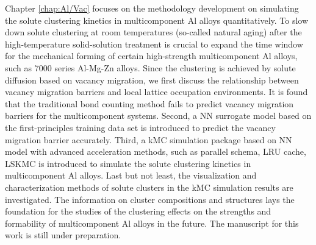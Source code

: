 Chapter \ref{chap:Al/Vac} focuses on the methodology development on simulating the solute clustering kinetics in multicomponent Al alloys quantitatively. To slow down solute clustering at room temperatures (so-called natural aging) after the high-temperature solid-solution treatment is crucial to expand the time window for the mechanical forming of certain high-strength multicomponent Al alloys, such as 7000 series Al-Mg-Zn alloys. Since the clustering is achieved by solute diffusion based on vacancy migration, we first discuss the relationship between vacancy migration barriers and local lattice occupation environments. It is found that the traditional bond counting method fails to predict vacancy migration barriers for the multicomponent systems. Second, a \acf{NN} surrogate model based on the first-principles training data set is introduced to predict the vacancy migration barrier accurately. Third, a \acf{kMC} simulation package based on \ac{NN} model with advanced acceleration methods, such as parallel schema, \acf{LRU} cache, \acf{LSKMC} is introduced to simulate the solute clustering kinetics in multicomponent Al alloys. Last but not least, the visualization and characterization methods of solute clusters in the \ac{kMC} simulation results are investigated. The information on cluster compositions and structures lays the foundation for the studies of the clustering effects on the strengths and formability of multicomponent Al alloys in the future. The manuscript for this work is still under preparation.

